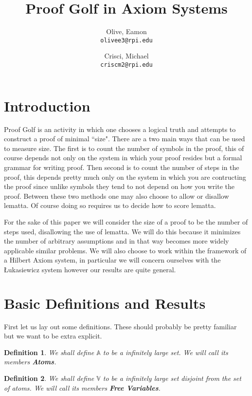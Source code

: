 \documentclass{article}
\title{Proof Golf in Axiom Systems}
\author{
Olive, Eamon \\
\texttt{olivee3@rpi.edu}
\and
Crisci, Michael \\
\texttt{criscm2@rpi.edu}
}
\newtheorem{defin}{Definition}
\begin{document}
\maketitle

\section{Introduction}

Proof Golf is an activity in which one chooses a logical truth and attempts to construct a proof of minimal ``size".
There are a two main ways that can be used to measure size.
The first is to count the number of symbols in the proof, this of course depends not only on the system in which your proof resides but a formal grammar for writing proof.
Then second is to count the number of steps in the proof, this depends pretty much only on the system in which you are contructing the proof since unlike symbols they tend to not depend on how you write the proof.
Between these two methods one may also choose to allow or disallow lematta.
Of course doing so requires us to decide how to score lematta.

For the sake of this paper we will consider the size of a proof to be the number of steps used, disallowing the use of lematta.
We will do this because it minimizes the number of arbitrary assumptions and in that way becomes more widely applicable similar problems.
We will also choose to work within the framework of a Hilbert Axiom system, in particular we will concern ourselves with the \L ukasiewicz system however our results are quite general.


\section{Basic Definitions and Results}

First let us lay out some definitions.
These should probably be pretty familiar but we want to be extra explicit.

\begin{defin}
We shall define $\mathbb{A}$ to be a infinitely large set.
We will call its members \textbf{Atoms}.
\end{defin}

\begin{defin}
We shall define $\mathbb{V}$ to be a infinitely large set disjoint from the set of atoms.
We will call its members \textbf{Free Variables}.
\end{defin}
\end{document}

